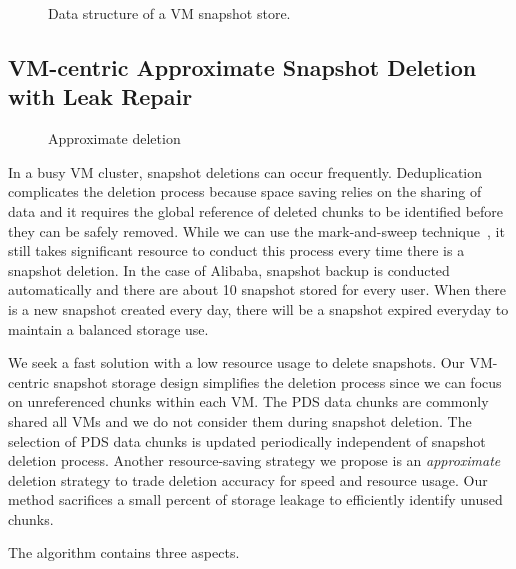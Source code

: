 \begin{figure}[htbp]
  \centering
  \caption{Data structure of a VM snapshot store.}
  \label{fig:as_arch}
\end{figure}

\subsection{ VM-centric Approximate Snapshot Deletion with Leak Repair}
\label{sect:delete}

\begin{figure}[htbp]
  \centering
  \caption{Approximate deletion}
  \label{fig:deletion_flow}
\end{figure}

In a busy VM cluster, snapshot deletions can occur frequently.
Deduplication complicates the deletion process because space saving relies on the sharing of data
and it requires the global reference of deleted chunks to be identified before  they can be safely removed.
While we can use the mark-and-sweep technique~\cite{Guo2011}, 
it still takes significant resource to conduct this process every time there is a snapshot deletion.
In the case of Alibaba, snapshot backup is conducted automatically and there are 
about 10 snapshot stored for every user. When there is
a new snapshot created every day,  there will be  a snapshot expired everyday to maintain
a balanced storage use. 

We seek a fast solution with a low resource usage to delete snapshots.
Our VM-centric snapshot storage design simplifies the deletion process since 
we can focus on  unreferenced chunks within each VM.
The PDS data chunks are commonly shared all VMs and we do not consider them
during snapshot deletion.  The selection of PDS data chunks is updated periodically independent of snapshot deletion process.
Another resource-saving strategy we propose is
an {\em approximate} deletion strategy to trade deletion accuracy for
speed and resource usage. Our method sacrifices a small percent of storage leakage
to efficiently identify unused chunks.

The algorithm contains three aspects.

